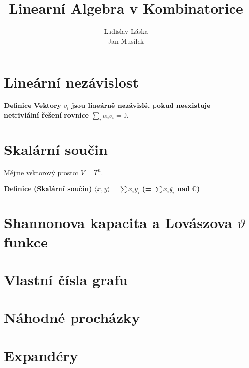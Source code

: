 \documentclass[a4paper,12pt,titlepage]{article}
\title{Linearní Algebra v Kombinatorice}
\author{Ladislav Láska\\ Jan Musílek}
\newcommand{\df}{\smallskip\noindent\bf Definice\rm{} }
\newcommand{\C}{\mathbb{C}}
\newcommand{\sk}[1]{{\langle #1\rangle}}
\begin{document}
\maketitle
\newpage
\tableofcontents
\newpage


\section{Lineární nezávislost}

\df Vektory $v_i$ jsou lineárně nezávislé, pokud neexistuje netriviální řešení 
rovnice $\sum_i \alpha_iv_i=0$.







\section{Skalární součin}

Mějme vektorový prostor $V = T^n$.

\df (Skalární součin) $\sk{x,y} = \sum x_iy_i$ \quad(= $\sum x_i\overline{y_i}$ nad $\C$)






\section{Shannonova kapacita a Lovászova $\vartheta$ funkce}





\section{Vlastní čísla grafu}







\section{Náhodné procházky}





\section{Expandéry}
\end{document}
